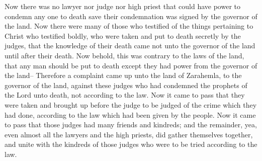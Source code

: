 Now there was no lawyer nor judge nor high priest that could have power to condemn any one to death save their condemnation was signed by the governor of the land.
\bverse \iffalse Now there were many of those who testified of the things pertaining to Christ who testified boldly, who were taken and put to death secretly by the judges, that the knowledge of their death came not unto the governor of the land until after their death. \fi
Now there were many of those who testified of the things pertaining to Christ who testified boldly, who were taken and put to death secretly by the judges, that the knowledge of their death came not unto the governor of the land until after their death.
\bverse \iffalse Now behold, this was contrary to the laws of the land, that any man should be put to death except they had power from the governor of the land-- \fi
Now behold, this was contrary to the laws of the land, that any man should be put to death except they had power from the governor of the land--
\bverse \iffalse Therefore a complaint came up unto the land of Zarahemla, to the governor of the land, against these judges who had condemned the prophets of the Lord unto death, not according to the law. \fi
Therefore a complaint came up unto the land of Zarahemla, to the governor of the land, against these judges who had condemned the prophets of the Lord unto death, not according to the law.
\bverse \iffalse Now it came to pass that they were taken and brought up before the judge to be judged of the crime which they had done, according to the law which had been given by the people. \fi
Now it came to pass that they were taken and brought up before the judge to be judged of the crime which they had done, according to the law which had been given by the people.
\bverse \iffalse Now it came to pass that those judges had many friends and kindreds; and the remainder, yea, even almost all the lawyers and the high priests, did gather themselves together, and unite with the kindreds of those judges who were to be tried according to the law. \fi
Now it came to pass that those judges had many friends and kindreds; and the remainder, yea, even almost all the lawyers and the high priests, did gather themselves together, and unite with the kindreds of those judges who were to be tried according to the law.
\bverse \iffalse And they did enter into a covenant one with another, yea, even into that covenant which was given by them of old, which covenant was given and administered by the devil, to combine against all righteousness. \fi
